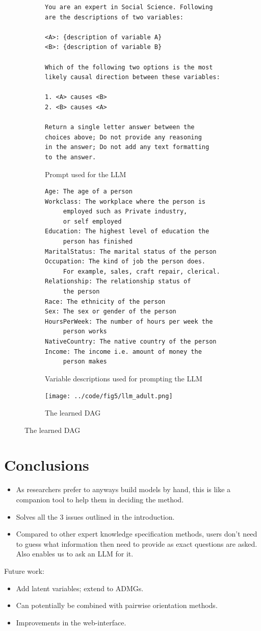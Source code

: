 \documentclass{uai2025} %
\begin{document}
\begin{figure}
	\centering
	\begin{subfigure}{0.5\textwidth}
		\begin{Verbatim}[fontsize=\footnotesize]
You are an expert in Social Science. Following
are the descriptions of two variables:

<A>: {description of variable A}
<B>: {description of variable B}

Which of the following two options is the most 
likely causal direction between these variables:

1. <A> causes <B>
2. <B> causes <A>

Return a single letter answer between the 
choices above; Do not provide any reasoning 
in the answer; Do not add any text formatting 
to the answer.
		\end{Verbatim}
	\caption{Prompt used for the LLM}
	\end{subfigure}
	\begin{subfigure}{0.5 \textwidth}
		\begin{Verbatim}[fontsize=\footnotesize]
Age: The age of a person
Workclass: The workplace where the person is 
     employed such as Private industry, 
     or self employed
Education: The highest level of education the 
     person has finished
MaritalStatus: The marital status of the person
Occupation: The kind of job the person does. 
     For example, sales, craft repair, clerical.
Relationship: The relationship status of 
     the person
Race: The ethnicity of the person
Sex: The sex or gender of the person
HoursPerWeek: The number of hours per week the 
     person works
NativeCountry: The native country of the person
Income: The income i.e. amount of money the 
     person makes
		\end{Verbatim}
	\caption{Variable descriptions used for prompting the LLM}
	\end{subfigure}
	\begin{subfigure}{0.5\textwidth}
		\centering
		\texttt{[image: ../code/fig5/llm\_adult.png]}
		\caption{The learned DAG}
	\end{subfigure}
\end{figure}

\section{Conclusions}
\begin{itemize}
	\item As researchers prefer to anyways build models by hand, this is like a companion tool to help them in deciding the method.
	\item Solves all the $ 3 $ issues outlined in the introduction.
	\item Compared to other expert knowledge specification methods, users don't need to guess what information then need to provide as exact questions are asked. Also enables us to ask an LLM for it.
\end{itemize}

Future work:
\begin{itemize}
	\item Add latent variables; extend to ADMGs.
	\item Can potentially be combined with pairwise orientation methods.
	\item Improvements in the web-interface.
\end{itemize}

\newpage

\end{document}
